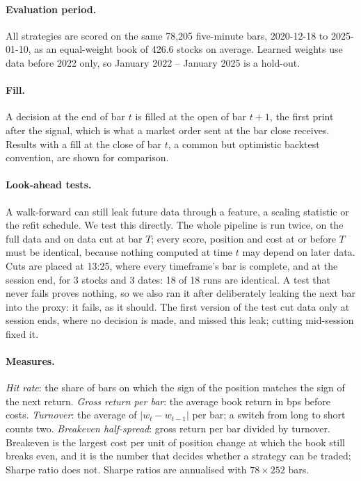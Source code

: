 \documentclass[11pt,a4paper]{article}
\begin{document}
\paragraph{Evaluation period.} All strategies are scored on the same 78{,}205 five-minute bars, 2020-12-18 to
2025-01-10, as an equal-weight book of 426.6 stocks on average. Learned weights use data before 2022
only, so January 2022 -- January 2025 is a hold-out.

\paragraph{Fill.} A decision at the end of bar $t$ is filled at the open of bar $t+1$, the first print
after the signal, which is what a market order sent at the bar close receives. Results with a fill at the
close of bar $t$, a common but optimistic backtest convention, are shown for comparison.

\paragraph{Look-ahead tests.} A walk-forward can still leak future data through a feature, a scaling
statistic or the refit schedule. We test this directly. The whole pipeline is run twice, on the full data
and on data cut at bar $T$; every score, position and cost at or before $T$ must be identical, because
nothing computed at time $t$ may depend on later data. Cuts are placed at 13:25, where every timeframe's
bar is complete, and at the session end, for 3 stocks and 3 dates: 18 of
18 runs are identical. A test that never fails proves nothing, so we also ran it after deliberately
leaking the next bar into the proxy: it fails, as it should. The first version of the test cut data
only at session ends, where no decision is made, and missed this leak; cutting mid-session fixed it.

\paragraph{Measures.} \emph{Hit rate}: the share of bars on which the sign of the position matches the sign
of the next return. \emph{Gross return per bar}: the average book return in bps before costs.
\emph{Turnover}: the average of $|w_t-w_{t-1}|$ per bar; a switch from long to short counts two.
\emph{Breakeven half-spread}: gross return per bar divided by turnover. Breakeven is the largest cost per unit
of position change at which the book still breaks even, and it is the number that decides whether a
strategy can be traded; Sharpe ratio does not. Sharpe ratios are annualised with $78\times252$ bars.
\end{document}
